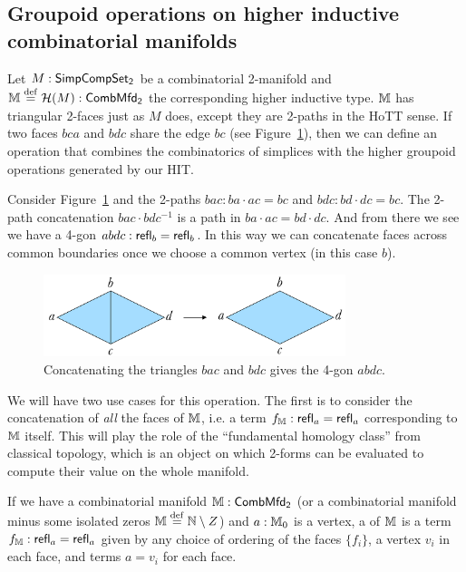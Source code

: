 \subsection{Groupoid operations on higher inductive combinatorial manifolds}

Let \( M:\mathsf{SimpCompSet_2} \) be a combinatorial 2-manifold and \( \mathbb{M}\stackrel{\mathrm{def}}{=}\mathcal{H}(M):\mathsf{CombMfd_2} \) the corresponding higher inductive type. \( \mathbb{M} \) has triangular 2-faces just as \( M \) does, except they are 2-paths in the HoTT sense. If two faces \( bca \) and \( bdc \) share the edge \( bc \) (see Figure~\ref{fig:concat}), then we can define an operation that combines the combinatorics of simplices with the higher groupoid operations generated by our HIT. 

Consider Figure~\ref{fig:concat} and the 2-paths \( bac: ba\cdot ac=bc \) and \( bdc: bd\cdot dc = bc \). The 2-path concatenation \( bac\cdot bdc^{-1} \) is a path in \( ba\cdot ac = bd\cdot dc \). And from there we see we have a 4-gon \( abdc:\mathsf{refl}_b=\mathsf{refl}_b \). In this way we can concatenate faces across common boundaries once we choose a common vertex (in this case \( b \)).

\begin{figure}[htbp]
\centering
\includegraphics[width=250pt]{concat.pdf}
\caption{Concatenating the triangles \( bac \) and \( bdc \) gives the 4-gon \( abdc \).}
\label{fig:concat}
\end{figure}

We will have two use cases for this operation. The first is to consider the concatenation of \emph{all} the faces of \( \mathbb{M} \), i.e. a term \( f_{\mathbb{M}}:\mathsf{refl}_a=\mathsf{refl}_a \) corresponding to \( \mathbb{M} \) itself. This will play the role of the ``fundamental homology class'' from classical topology, which is an object on which 2-forms can be evaluated to compute their value on the whole manifold. 

\begin{mydef}
\label{def:totalface}
If we have a combinatorial manifold \( \mathbb{M}:\mathsf{CombMfd_2} \) (or a combinatorial manifold minus some isolated zeros \( \mathbb{M}\stackrel{\mathrm{def}}{=}\mathbb{N}\setminus Z \)) and \( a:\mathbb{M}_0 \) is a vertex, a  of \( \mathbb{M} \) is a term \( f_{\mathbb{M}}:\mathsf{refl}_a=\mathsf{refl}_a \) given by any choice of ordering of the faces \( \{f_i\} \), a vertex \( v_i \) in each face, and terms \( a=v_i \) for each face.
\end{mydef}

